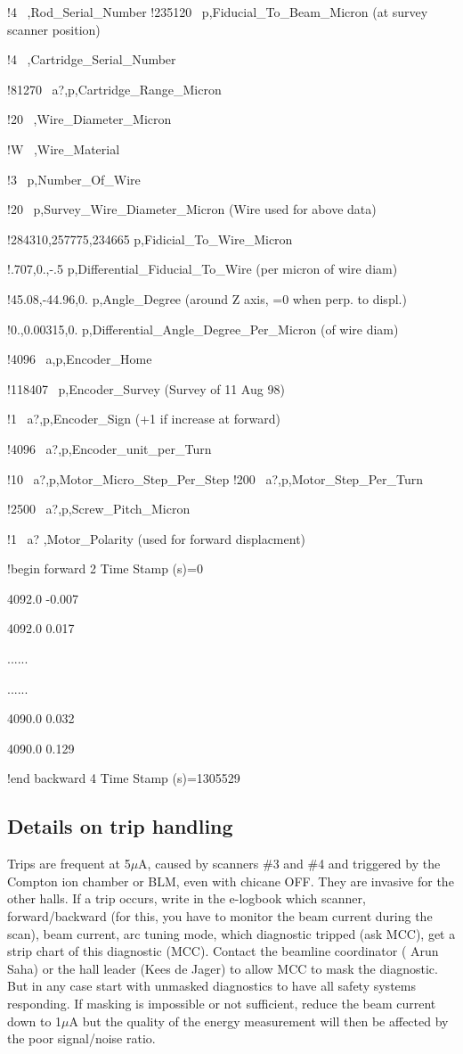 !4 ~,Rod\_Serial\_Number !235120 ~p,Fiducial\_To\_Beam\_Micron (at survey scanner
position) 

!4 ~,Cartridge\_Serial\_Number 

!81270 ~a?,p,Cartridge\_Range\_Micron 

!20 ~,Wire\_Diameter\_Micron 

!W ~,Wire\_Material 

!3 ~p,Number\_Of\_Wire 

!20 ~p,Survey\_Wire\_Diameter\_Micron (Wire used for above data) 

!284310,257775,234665 p,Fidicial\_To\_Wire\_Micron 

!.707,0.,-.5 p,Differential\_Fiducial\_To\_Wire (per micron of wire diam) 

!45.08,-44.96,0. p,Angle\_Degree (around Z axis, =0 when perp. to displ.) 

!0.,0.00315,0. p,Differential\_Angle\_Degree\_Per\_Micron (of wire diam) 

!4096 ~a,p,Encoder\_Home 

!118407 ~p,Encoder\_Survey (Survey of 11 Aug 98) 

!1 ~a?,p,Encoder\_Sign (+1 if increase at forward) 

!4096 ~a?,p,Encoder\_unit\_per\_Turn 

!10 ~a?,p,Motor\_Micro\_Step\_Per\_Step !200 ~a?,p,Motor\_Step\_Per\_Turn 

!2500 ~a?,p,Screw\_Pitch\_Micron 

!1 ~a? ,Motor\_Polarity (used for forward displacment) 

!begin forward 2 Time Stamp (s)=0 

4092.0 -0.007 

4092.0 0.017 

......

...... 

4090.0 0.032 

4090.0 0.129 

!end backward 4 Time Stamp (s)=1305529


\subsection{Details on trip handling }

Trips are frequent at 5$\mu$A, caused by scanners \#3 and \#4 and triggered by the
Compton ion chamber or BLM, even with chicane OFF. They are invasive for the
other halls. If a trip occurs, write in the e-logbook which scanner, forward/backward
(for this, you have to monitor the beam current during the scan), beam current,
arc tuning mode, which diagnostic tripped (ask MCC), get a strip chart of
this diagnostic (MCC). Contact the beamline coordinator ( Arun Saha) or the
hall leader (Kees de Jager) to allow MCC to mask the diagnostic. But in any case start
with unmasked diagnostics to have all safety systems responding. If masking
is impossible or not sufficient, reduce the beam current down to 1$\mu$A but the
quality of the energy measurement will then be affected by the poor signal/noise
ratio. 

